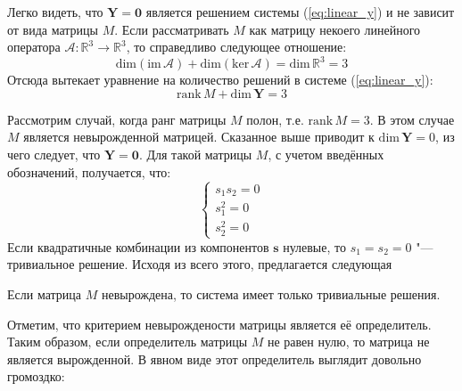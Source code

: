 Легко видеть, что $\mathbf{Y} = \mathbf{0}$ является решением системы (\ref{eq:linear_y}) и не 
зависит от вида матрицы $M$. Если рассматривать $M$ как матрицу некоего линейного оператора 
$\mathcal{A} : \mathbb{R}^3 \to \mathbb{R}^3 $, то справедливо следующее отношение:
$$
	\textrm{dim}(\textrm{im}\,\mathcal{A}) + \textrm{dim}(\textrm{ker}\,\mathcal{A}) = \textrm{dim}\,
	\mathbb{R}^3 = 3
$$
Отсюда вытекает уравнение на количество решений в системе (\ref{eq:linear_y}):
$$
	\textrm{rank}\,M + \textrm{dim}\,\mathbf{Y} = 3
$$

Рассмотрим случай, когда ранг матрицы $M$ полон, т.е. $\textrm{rank}\,M = 3$. В этом случае $M$ 
является невырожденной матрицей. Сказанное выше приводит к $\textrm{dim}\,\mathbf{Y} = 0$, из чего 
следует, что $\mathbf{Y} = \mathbf{0}$. Для такой матрицы $M$, с учетом введённых обозначений, 
получается, что: 
$$
	\begin{cases}
		s_1 s_2 = 0 \\
		s_1 ^ 2 = 0 \\
		s_2 ^ 2 = 0
	\end{cases}
$$
Если квадратичные комбинации из компонентов $\mathbf{s}$ нулевые, то $s_1 = s_2 = 0$ "--- тривиальное 
решение. Исходя из всего этого, предлагается следующая
\begin{theorem} \label{thm:theorem_one}
Если матрица $M$ невырождена, то система имеет только тривиальные решения.
\end{theorem}
Отметим, что критерием невырождености матрицы является её определитель. Таким образом, если 
определитель матрицы $M$ не равен нулю, то матрица не является вырожденной. В явном виде этот определитель выглядит довольно громоздко:

